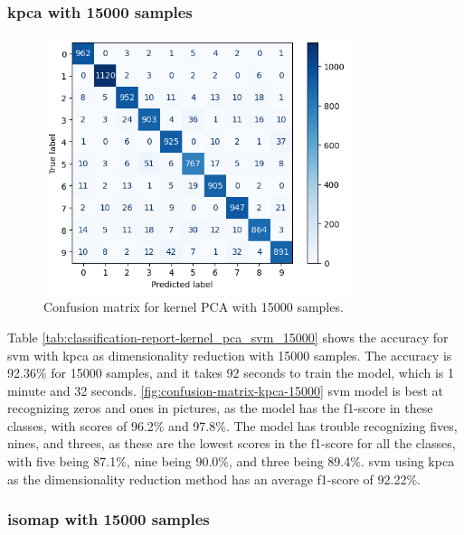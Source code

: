 \subsubsection{\gls{kpca} with 15000 samples}\label{subsubsec:experiment-1-results-kernel_pca-15000}





\begin{figure}[htb!]
    \centering
    \includegraphics[width=0.8\textwidth]{figures/1-experiment/confusion_matrix_kernel_pca_svm_15000.png}
    \caption{Confusion matrix for kernel PCA with 15000 samples.}
    \label{fig:confusion-matrix-kpca-15000}
\end{figure}


Table \ref{tab:classification-report-kernel_pca_svm_15000} shows the accuracy for \gls{svm} with \gls{kpca} as dimensionality reduction with 15000 samples. The accuracy is 92.36\% for 15000 samples, and it takes 92 seconds to train the model, which is 1 minute and 32 seconds. \autoref{fig:confusion-matrix-kpca-15000} \gls{svm} model is best at recognizing zeros and ones in pictures, as the model has the f1-score in these classes, with scores of 96.2\% and 97.8\%. The model has trouble recognizing fives, nines, and threes, as these are the lowest scores in the f1-score for all the classes, with five being 87.1\%, nine being 90.0\%, and three being 89.4\%. \gls{svm} using \gls{kpca} as the dimensionality reduction method has an average f1-score of 92.22\%.

\subsubsection{\gls{isomap} with 15000 samples}\label{subsubsec:experiment-1-results-isomap-15000}




